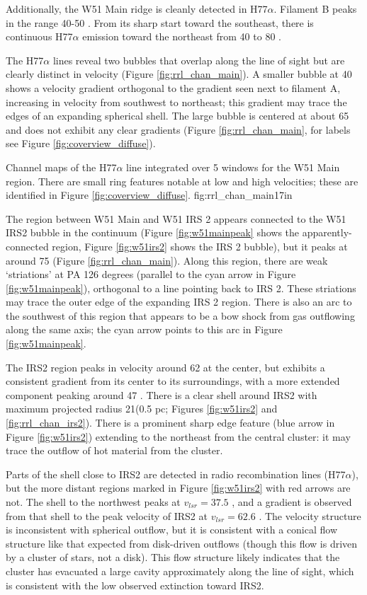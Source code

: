 Additionally, the W51 Main ridge is cleanly detected in H77$\alpha$.  Filament
B peaks in the range 40-50 \kms.  From its sharp start toward the southeast,
there is continuous H77$\alpha$ emission toward the northeast from 40 to 80
\kms.

The H77$\alpha$ lines reveal two bubbles that overlap along the line of sight
but are clearly distinct in velocity (Figure \ref{fig:rrl_chan_main}).  A
smaller bubble at 40 \kms shows a velocity gradient orthogonal to the gradient
seen next to filament A, increasing in velocity from southwest to northeast;
this gradient may trace the edges of an expanding spherical shell.  The large
bubble is centered at about 65 \kms and does not exhibit any clear gradients
(Figure \ref{fig:rrl_chan_main}, for labels see Figure
\ref{fig:coverview_diffuse}).

{Channel maps of the H77$\alpha$ line integrated over 5 \kms windows
for the W51 Main region.  There are small ring features notable at low and high
velocities; these are identified in Figure \ref{fig:coverview_diffuse}.}
{fig:rrl_chan_main}{1}{7in}

The \hii region between W51 Main and W51 IRS 2 appears connected to the W51 IRS2
bubble in the continuum (Figure \ref{fig:w51mainpeak} shows the
apparently-connected region, Figure \ref{fig:w51irs2} shows the IRS 2 bubble),
but it peaks at around 75 \kms (Figure \ref{fig:rrl_chan_main}).  Along this
region, there are weak `striations' at PA 126 degrees (parallel to the cyan
arrow in Figure \ref{fig:w51mainpeak}), orthogonal to a line pointing back to
IRS 2.  These striations  may trace the outer edge of the expanding IRS 2
region.  There is also an arc to the southwest of this region that appears to
be a bow shock from gas outflowing along the same axis; the cyan arrow points
to this arc in Figure \ref{fig:w51mainpeak}.

The IRS2 region peaks in velocity around 62 \kms at the center, but exhibits a
consistent gradient from its center to its surroundings, with a more extended
component peaking around 47 \kms.  There is a clear shell around IRS2
with maximum projected radius 21\arcsec (0.5 pc; Figures \ref{fig:w51irs2} and
\ref{fig:rrl_chan_irs2}).  There is a prominent sharp edge feature (blue arrow
in Figure \ref{fig:w51irs2}) extending to the northeast from the central
cluster: it may trace the outflow of hot material from the cluster.

Parts of the shell close to IRS2 are detected in radio recombination lines
(H77$\alpha$), but the more distant regions marked in Figure \ref{fig:w51irs2}
with red arrows are not.  The shell to the northwest peaks at $v_{lsr}=37.5$
\kms, and a gradient is observed from that shell to the peak velocity of IRS2
at $v_{lsr} = 62.6$ \kms.  The velocity structure is inconsistent with
spherical outflow, but it is consistent with a conical flow structure like that
expected from disk-driven outflows (though this flow is driven by a cluster of
stars, not a disk).  This flow structure likely indicates that
the cluster has evacuated a large cavity approximately along the line of sight,
which is consistent with the low observed extinction toward IRS2.  

